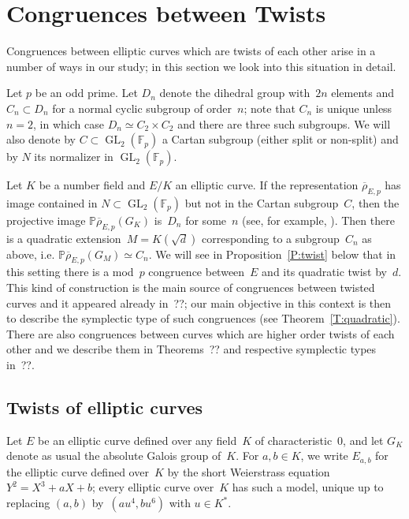 \documentclass[12pt, reqno]{amsart}
\newcommand{\F}{\mathbb{F}}
\newcommand{\PP}{\mathbb{P}}
\newcommand{\rhobar}{{\overline{\rho}}}
\newcommand{\GL}{\operatorname{GL}}
\newcommand{\PGL}{\operatorname{PGL}}
\numberwithin{equation}{section}
\theoremstyle{definition}
\theoremstyle{remark}
\begin{document}
\section{Congruences between Twists}\label{S:cong-twist}

Congruences between elliptic curves which are twists of each other arise in a number of ways in our study; in this section we look into this situation in detail.

Let $p$ be an odd prime. Let $D_{n}$ denote the dihedral group
with~$2n$ elements and $C_n \subset D_{n}$ for a normal cyclic
subgroup of order~$n$; note that $C_n$ is unique unless $n=2$, in
which case $D_{n} \simeq C_2 \times C_2$ and there are three such
subgroups.  We will also denote by $C \subset \GL_2(\F_p)$ a Cartan
subgroup (either split or non-split) and by $N$ its normalizer in
$\GL_2(\F_p)$.  



Let $K$ be a number field and $E/K$ an elliptic curve. If the
representation $\rhobar_{E,p}$ has image contained in $N \subset
\GL_2(\F_p)$ but not in the Cartan subgroup~$C$, then the projective
image $\PP \rhobar_{E,p}(G_K)$ is~$D_{n}$ for some~$n$ (see, for
example, \cite[Theorem XI.2.3]{LangModForms}). Then there is a
quadratic extension~$M = K(\sqrt{d})$ corresponding to a
subgroup~$C_n$ as above, i.e. $\PP \rhobar_{E,p}(G_M) \simeq C_n$.  We
will see in Proposition~\ref{P:twist} below that in this setting there
is a mod~$p$ congruence between~$E$ and its quadratic twist by~$d$.
This kind of construction is the main source of congruences between
twisted curves and it appeared already in~??; our main objective in
this context is then to describe the symplectic type of such
congruences (see Theorem~\ref{T:quadratic}). There are also
congruences between curves which are higher order twists of each other
and we describe them in Theorems~?? and respective symplectic types
in~??.

\subsection{Twists of elliptic curves}

Let $E$ be an elliptic curve defined over any field~$K$ of
characteristic~$0$, and let $G_K$ denote as usual the absolute Galois
group of~$K$.  For $a, b \in K$, we write $E_{a,b}$ for the elliptic
curve defined over~$K$ by the short Weierstrass equation
$Y^2=X^3+aX+b$; every elliptic curve over~$K$ has such a model, unique
up to replacing $(a,b)$ by~$(au^4,bu^6)$ with $u\in K^*$.
\end{document}
